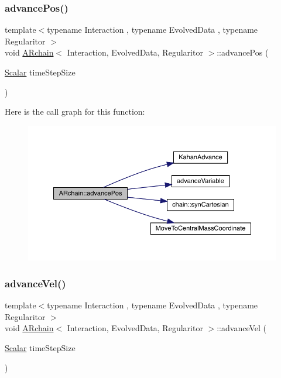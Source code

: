 \subsubsection{\texorpdfstring{advance\+Pos()}{advancePos()}}
{\footnotesize\ttfamily template$<$typename Interaction , typename Evolved\+Data , typename Regularitor $>$ \\
void \mbox{\hyperlink{class_a_rchain}{A\+Rchain}}$<$ Interaction, Evolved\+Data, Regularitor $>$\+::advance\+Pos (\begin{DoxyParamCaption}\item[{\mbox{\hyperlink{class_a_rchain_a707e42a79e4744424a34c9007e84ee07}{Scalar}}}]{time\+Step\+Size }\end{DoxyParamCaption})}

Here is the call graph for this function\+:
\nopagebreak
\begin{figure}[H]
\begin{center}
\leavevmode
\includegraphics[width=350pt]{class_a_rchain_a8d3ac75a6b4231e0859492257553316e_cgraph}
\end{center}
\end{figure}
\mbox{\label{class_a_rchain_a6a76ab7a095adfbf4a69226a31d866d4}} 
\subsubsection{\texorpdfstring{advance\+Vel()}{advanceVel()}}
{\footnotesize\ttfamily template$<$typename Interaction , typename Evolved\+Data , typename Regularitor $>$ \\
void \mbox{\hyperlink{class_a_rchain}{A\+Rchain}}$<$ Interaction, Evolved\+Data, Regularitor $>$\+::advance\+Vel (\begin{DoxyParamCaption}\item[{\mbox{\hyperlink{class_a_rchain_a707e42a79e4744424a34c9007e84ee07}{Scalar}}}]{time\+Step\+Size }\end{DoxyParamCaption})}

